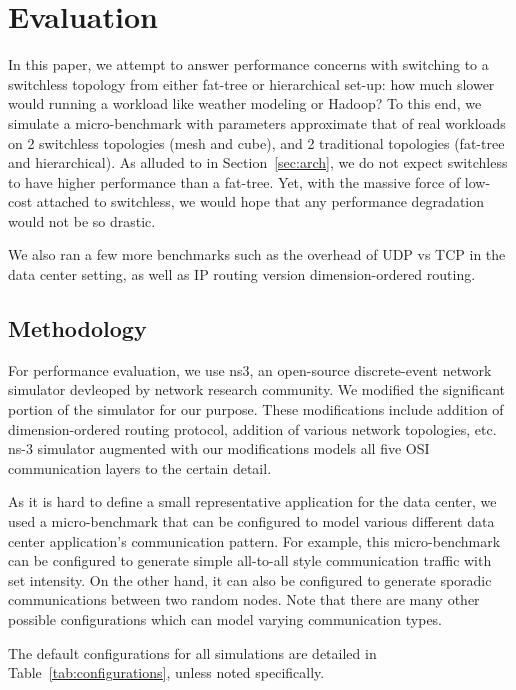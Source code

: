 \section{Evaluation}
\label{sec:eval}
In this paper, we attempt to answer performance concerns with switching to a switchless topology from either fat-tree or hierarchical set-up: how much slower would running a workload like weather modeling or Hadoop? To this end, we simulate a micro-benchmark with parameters approximate that of real workloads on 2 switchless topologies (mesh and cube), and 2 traditional topologies (fat-tree and hierarchical). As alluded to in Section~\ref{sec:arch}, we do not expect switchless to have higher performance than a fat-tree. Yet, with the massive force of low-cost attached to switchless, we would hope that any performance degradation would not be so drastic.

We also ran a few more benchmarks such as the overhead of UDP vs TCP in the data center setting, as well as IP routing version dimension-ordered routing.

\subsection {Methodology}
For performance evaluation, we use ns3, an open-source discrete-event network simulator devleoped by network research community. We modified the significant portion of the simulator for our purpose. These modifications include addition of dimension-ordered routing protocol, addition of various network topologies, etc. ns-3 simulator augmented with our modifications models all five OSI communication layers to the certain detail.

As it is hard to define a small representative application for the data center, we used a micro-benchmark that can be configured to model various different data center application's communication pattern. For example, this micro-benchmark can be configured to generate simple all-to-all style communication traffic with set intensity. On the other hand, it can also be configured to generate sporadic communications between two random nodes. Note that there are many other possible configurations which can model varying communication types.

The default configurations for all simulations are detailed in Table~\ref{tab:configurations}, unless noted specifically.

